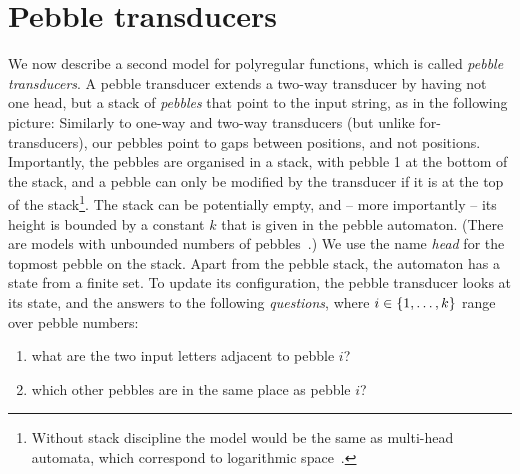 \section{Pebble transducers}
\label{sec:polyregular-pebble}
We now describe a second model for polyregular functions, which is called \emph{pebble transducers}. 
A pebble transducer extends a two-way transducer by having not one head, but a stack of  \emph{pebbles} that point to the input string, as in the following picture:
Similarly to one-way and  two-way transducers (but unlike for-transducers), our pebbles point to gaps between positions, and not positions. 
Importantly, the pebbles are organised in a stack, with pebble 1 at the bottom of the stack, and a  pebble can only be modified by the transducer if it is at the top of the stack\footnote{
    \label{footnote:stack-discipline}
    Without  stack discipline the model would be the same as multi-head automata, which correspond to logarithmic space~\cite[Corollary 3.5]{ibarra1971}.}.
The stack can be potentially empty, and -- more importantly -- its height is bounded by a constant $k$ that is given in the pebble automaton. (There are models with unbounded numbers of pebbles~\cite{engelfriet2007}.)
We use the name \emph{head} for the topmost pebble on the stack. Apart from the pebble stack, the automaton has a state from a finite set. To update its configuration, the pebble transducer looks at its state, and the answers to the  following \emph{questions}, where $i \in \{1,\ldots,k\}$ range over pebble numbers:
\begin{enumerate}
    \item \label{pebble-question:label} what are the two input letters adjacent to pebble $i$?
    \item \label{pebble-question:left} which other pebbles are in the same place as pebble $i$?
\end{enumerate}
